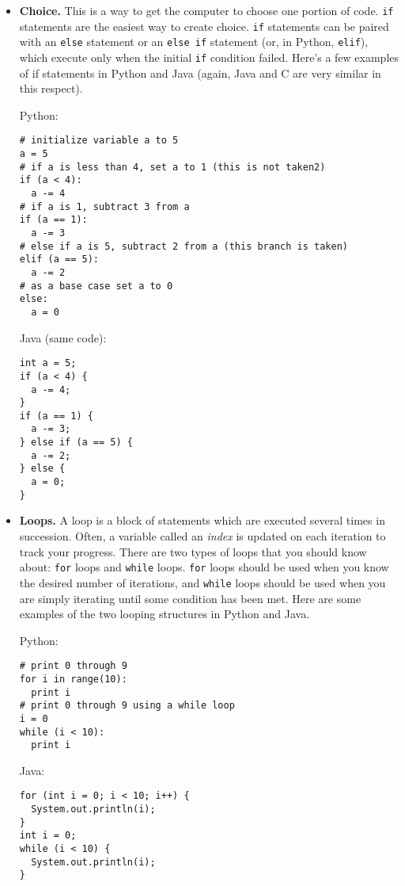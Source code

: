 \documentclass[a4paper]{article}
\begin{document}
\begin{itemize}
\item {\bf Choice.} This is a way to get the computer to choose one portion of code. \texttt{if} statements are the easiest way to create choice. \texttt{if} statements can be paired with an \texttt{else} statement or an \texttt{else if} statement (or, in Python, \texttt{elif}), which execute only when the initial \texttt{if} condition failed. Here's a few examples of if statements in Python and Java (again, Java and C are very similar in this respect).

Python:
\begin{verbatim}
# initialize variable a to 5
a = 5
# if a is less than 4, set a to 1 (this is not taken2)
if (a < 4):
  a -= 4
# if a is 1, subtract 3 from a
if (a == 1):
  a -= 3
# else if a is 5, subtract 2 from a (this branch is taken)
elif (a == 5):
  a -= 2
# as a base case set a to 0
else:
  a = 0
\end{verbatim}

Java (same code):
\begin{verbatim}
int a = 5;
if (a < 4) {
  a -= 4;
}
if (a == 1) {
  a -= 3;
} else if (a == 5) {
  a -= 2;
} else {
  a = 0;
}
\end{verbatim}



\item {\bf Loops.} A loop is a block of statements which are executed several times in succession. Often, a variable called an {\it index} is updated on each iteration to track your progress. There are two types of loops that you should know about: \texttt{for} loops and \texttt{while} loops. \texttt{for} loops should be used when you know the desired number of iterations, and \texttt{while} loops should be used when you are simply iterating until some condition has been met. Here are some examples of the two looping structures in Python and Java.

Python:
\begin{verbatim}
# print 0 through 9
for i in range(10):
  print i
# print 0 through 9 using a while loop
i = 0
while (i < 10):
  print i
\end{verbatim}

Java:
\begin{verbatim}
for (int i = 0; i < 10; i++) {
  System.out.println(i);
}
int i = 0;
while (i < 10) {
  System.out.println(i);
}
\end{verbatim}

\end{itemize}
\end{document}
